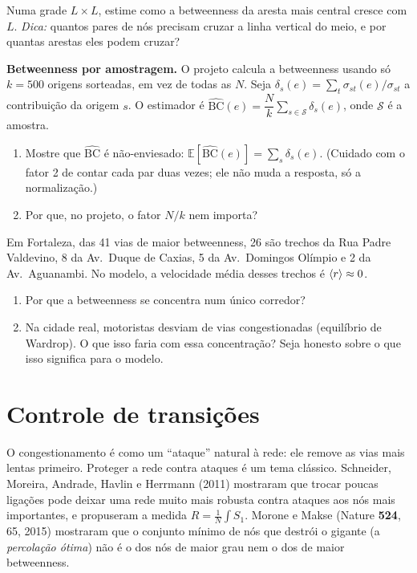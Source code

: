 \documentclass[11pt]{article}
\begin{document}
 Numa grade $L\times L$, estime como a betweenness da aresta mais central cresce com $L$. \emph{Dica:} quantos pares de nós precisam cruzar a linha vertical do meio, e por quantas arestas eles podem cruzar?

 \textbf{Betweenness por amostragem.} O projeto calcula a betweenness usando só $k=500$ origens sorteadas, em vez de todas as $N$. Seja $\delta_s(e) = \sum_t \sigma_{st}(e)/\sigma_{st}$ a contribuição da origem $s$. O estimador é $\widehat{\mathrm{BC}}(e) = \dfrac{N}{k}\sum_{s\in\mathcal S}\delta_s(e)$, onde $\mathcal S$ é a amostra.
\begin{enumerate}
  \item Mostre que $\widehat{\mathrm{BC}}$ é não-enviesado: $\mathbb E[\widehat{\mathrm{BC}}(e)] = \sum_s\delta_s(e)$. (Cuidado com o fator 2 de contar cada par duas vezes; ele não muda a resposta, só a normalização.)
  \item Por que, no projeto, o fator $N/k$ nem importa?
\end{enumerate}

 Em Fortaleza, das 41 vias de maior betweenness, 26 são trechos da Rua Padre Valdevino, 8 da Av.\ Duque de Caxias, 5 da Av.\ Domingos Olímpio e 2 da Av.\ Aguanambi. No modelo, a velocidade média desses trechos é $\left\langle r \right\rangle\approx0$.
\begin{enumerate}
  \item Por que a betweenness se concentra num único corredor?
  \item Na cidade real, motoristas desviam de vias congestionadas (equilíbrio de Wardrop). O que isso faria com essa concentração? Seja honesto sobre o que isso significa para o modelo.
\end{enumerate}

\section{Controle de transições}

O congestionamento é como um ``ataque'' natural à rede: ele remove as vias mais lentas primeiro. Proteger a rede contra ataques é um tema clássico. Schneider, Moreira, Andrade, Havlin e Herrmann (2011) mostraram que trocar poucas ligações pode deixar uma rede muito mais robusta contra ataques aos nós mais importantes, e propuseram a medida $R = \frac1N\int S_1$. Morone e Makse (Nature \textbf{524}, 65, 2015) mostraram que o conjunto mínimo de nós que destrói o gigante (a \emph{percolação ótima}) não é o dos nós de maior grau nem o dos de maior betweenness.
\end{document}
